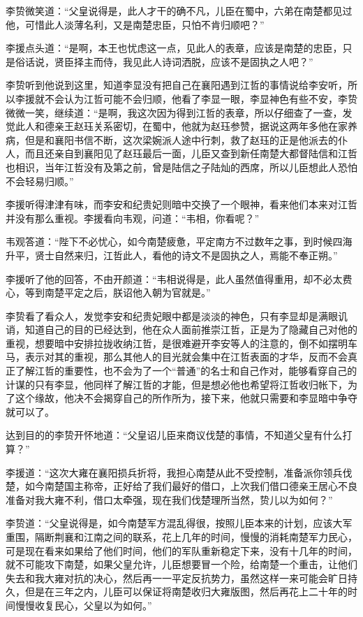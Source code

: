 李贽微笑道：“父皇说得是，此人才干的确不凡，儿臣在蜀中，六弟在南楚都见过他，可惜此人淡薄名利，又是南楚忠臣，只怕不肯归顺吧？”

李援点头道：“是啊，本王也忧虑这一点，见此人的表章，应该是南楚的忠臣，只是俗话说，贤臣择主而侍，我见此人诗词洒脱，应该不是固执之人吧？”

李贽听到他说到这里，知道李显没有把自己在襄阳遇到江哲的事情说给李安听，所以李援就不会认为江哲可能不会归顺，他看了李显一眼，李显神色有些不安，李贽微微一笑，继续道：“是啊，我这次因为得到江哲的表章，所以仔细查了一查，发觉此人和德亲王赵珏关系密切，在蜀中，他就为赵珏参赞，据说这两年多他在家养病，但是和襄阳书信不断，这次梁婉派人途中行刺，救了赵珏的正是他派去的仆人，而且还亲自到襄阳见了赵珏最后一面，儿臣又查到新任南楚大都督陆信和江哲也相识，当年江哲没有及第之前，曾是陆信之子陆灿的西席，所以儿臣想此人恐怕不会轻易归顺。”

李援听得津津有味，而李安和纪贵妃则暗中交换了一个眼神，看来他们本来对江哲并没有那么重视。李援看向韦观，问道：“韦相，你看呢？”

韦观答道：“陛下不必忧心，如今南楚疲惫，平定南方不过数年之事，到时候四海升平，贤士自然来归，江哲此人，看他的诗文不是固执之人，焉能不奉正朔。”

李援听了他的回答，不由开颜道：“韦相说得是，此人虽然值得重用，却不必太费心，等到南楚平定之后，朕诏他入朝为官就是。”

李贽看了看众人，发觉李安和纪贵妃眼中都是淡淡的神色，只有李显却是满眼讥诮，知道自己的目的已经达到，他在众人面前推崇江哲，正是为了隐藏自己对他的重视，想要暗中安排拉拢收纳江哲，是很难避开李安等人的注意的，倒不如摆明车马，表示对其的重视，那么其他人的目光就会集中在江哲表面的才华，反而不会真正了解江哲的重要性，也不会为了一个“普通”的名士和自己作对，能够看穿自己的计谋的只有李显，他同样了解江哲的才能，但是想必他也希望将江哲收归帐下，为了这个缘故，他决不会揭穿自己的所作所为，接下来，他就只需要和李显暗中争夺就可以了。

达到目的的李贽开怀地道：“父皇诏儿臣来商议伐楚的事情，不知道父皇有什么打算？”

李援道：“这次大雍在襄阳损兵折将，我担心南楚从此不受控制，准备派你领兵伐楚，如今南楚国主称帝，正好给了我们最好的借口，上次我们借口德亲王居心不良准备对我大雍不利，借口太牵强，现在我们伐楚理所当然，贽儿以为如何？”

李贽道：“父皇说得是，如今南楚军方混乱得很，按照儿臣本来的计划，应该大军重围，隔断荆襄和江南之间的联系，花上几年的时间，慢慢的消耗南楚军力民心，可是现在看来如果给了他们时间，他们的军队重新稳定下来，没有十几年的时间，就不可能攻下南楚，如果父皇允许，儿臣想要冒一个险，给南楚一个重击，让他们失去和我大雍对抗的决心，然后再一一平定反抗势力，虽然这样一来可能会旷日持久，但是在三年之内，儿臣可以保证将南楚收归大雍版图，然后再花上二十年的时间慢慢收复民心，父皇以为如何。”

